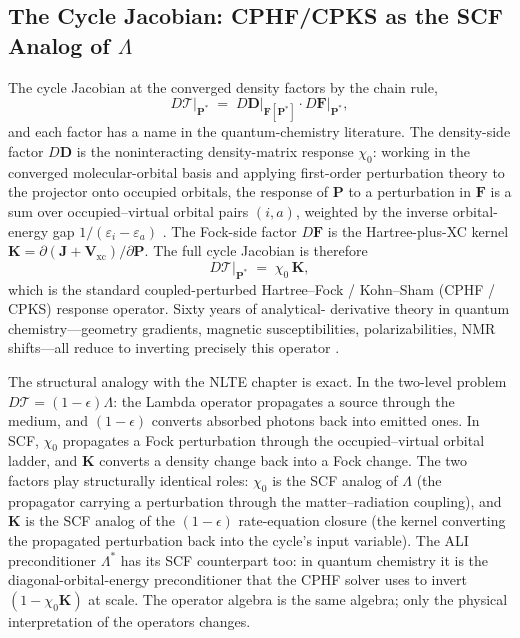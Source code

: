 \documentclass[11pt]{article}
\newcommand{\Lop}{\Lambda}
\newcommand{\Lstar}{\Lambda^{*}}
\newcommand{\Tcyc}{\mathcal{T}}
\begin{document}
\subsection{The Cycle Jacobian: CPHF/CPKS as the SCF Analog of $\Lambda$}
\label{sec:scf-cphf}

The cycle Jacobian at the converged density factors by the chain
rule,
\begin{equation}
D\Tcyc\bigl|_{\mathbf{P}^{*}}
\;=\;
D\mathbf{D}\bigl|_{\mathbf{F}[\mathbf{P}^{*}]} \cdot
D\mathbf{F}\bigl|_{\mathbf{P}^{*}} ,
\label{eq:scf-DT-chain}
\end{equation}
and each factor has a name in the quantum-chemistry literature.  The
density-side factor $D\mathbf{D}$ is the noninteracting
density-matrix response $\chi_0$: working in the converged
molecular-orbital basis and applying first-order perturbation theory
to the projector onto occupied orbitals, the response of $\mathbf{P}$
to a perturbation in $\mathbf{F}$ is a sum over occupied--virtual
orbital pairs $(i, a)$, weighted by the inverse orbital-energy gap
$1/(\varepsilon_i - \varepsilon_a)$
\citep{Sternheimer1954,FurcheAhlrichs2002}.  The Fock-side factor
$D\mathbf{F}$ is the Hartree-plus-XC kernel $\mathbf{K} =
\partial(\mathbf{J} + \mathbf{V}_{\text{xc}})/\partial\mathbf{P}$.
The full cycle Jacobian is therefore
\begin{equation}
D\Tcyc\bigl|_{\mathbf{P}^{*}} \;=\; \chi_0\,\mathbf{K} ,
\label{eq:scf-DT-chi0K}
\end{equation}
which is the standard coupled-perturbed Hartree--Fock / Kohn--Sham
(CPHF / CPKS) response operator.  Sixty years of analytical-
derivative theory in quantum chemistry---geometry gradients,
magnetic susceptibilities, polarizabilities, NMR shifts---all
reduce to inverting precisely this operator
\citep{Pople1979,Helgaker2000}.

The structural analogy with the NLTE chapter is exact.  In the
two-level problem $D\Tcyc = (1-\epsilon)\Lop$: the Lambda operator
propagates a source through the medium, and $(1-\epsilon)$ converts
absorbed photons back into emitted ones.  In SCF, $\chi_0$ propagates
a Fock perturbation through the occupied--virtual orbital ladder, and
$\mathbf{K}$ converts a density change back into a Fock change.  The
two factors play structurally identical roles: $\chi_0$ is the SCF
analog of $\Lop$ (the propagator carrying a perturbation through the
matter--radiation coupling), and $\mathbf{K}$ is the SCF analog of
the $(1-\epsilon)$ rate-equation closure (the kernel converting the
propagated perturbation back into the cycle's input variable).  The
ALI preconditioner $\Lstar$ has its SCF counterpart too: in
quantum chemistry it is the diagonal-orbital-energy preconditioner
that the CPHF solver uses to invert $(1 - \chi_0\mathbf{K})$ at scale.
The operator algebra is the same algebra; only the physical
interpretation of the operators changes.
\end{document}
